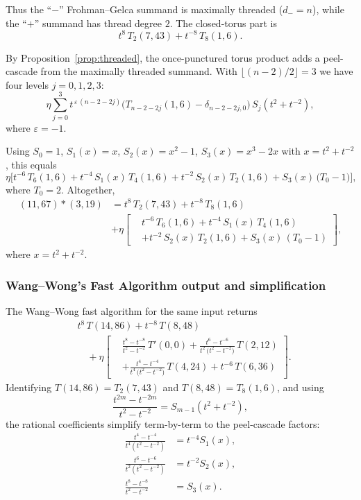 \documentclass[12pt]{article}
\begin{document}
Thus the ``$-$'' Frohman--Gelca summand is maximally threaded ($d_{-}=n$), while the ``$+$'' summand has thread degree $2$. The closed-torus part is
\[
t^{8}\,T_{2}(7,43) + t^{-8}\,T_{8}(1,6).
\]

By Proposition~\ref{prop:threaded}, the once-punctured torus product adds a peel-cascade from the maximally threaded summand. With $\lfloor(n-2)/2\rfloor=3$ we have four levels $j=0,1,2,3$:
\[
\eta\!\sum_{j=0}^{3} t^{\,\varepsilon\,(n-2-2j)}
\Big(T_{n-2-2j}(1,6)-\delta_{n-2-2j,0}\Big)\,S_j(t^{2}+t^{-2}),
\]
where $\varepsilon=-1$.

Using $S_{0}=1$, $S_{1}(x)=x$, $S_{2}(x)=x^{2}-1$, $S_{3}(x)=x^{3}-2x$ with $x=t^{2}+t^{-2}$, this equals
\[
\eta\Big[
t^{-6}\,T_{6}(1,6) + t^{-4}\,S_{1}(x)\,T_{4}(1,6)
+ t^{-2}\,S_{2}(x)\,T_{2}(1,6) + S_{3}(x)\,\big(T_{0}-1\big)
\Big],
\]
where $T_{0}=2$. Altogether,
\begin{align}
(11,67)\ast(3,19) &= t^{8}\,T_{2}(7,43) + t^{-8}\,T_{8}(1,6) \\
&+ \eta\left[\begin{aligned}
&t^{-6}\,T_{6}(1,6) + t^{-4}\,S_{1}(x)\,T_{4}(1,6) \\
&+ t^{-2}\,S_{2}(x)\,T_{2}(1,6) + S_{3}(x)\,(T_{0}-1)
\end{aligned}\right],
\end{align}
where $x=t^{2}+t^{-2}.$
\subsubsection*{Wang--Wong's Fast Algorithm output and simplification}

The Wang--Wong fast algorithm for the same input returns
\begin{align}
&t^{8}\,T(14,86) + t^{-8}\,T(8,48) \nonumber \\
&\quad + \eta\left[\begin{aligned}
&\frac{t^{8}-t^{-8}}{t^{2}-t^{-2}}\,T'(0,0) + \frac{t^{6}-t^{-6}}{t^{2}\,\big(t^{2}-t^{-2}\big)}\,T(2,12) \\
&+ \frac{t^{4}-t^{-4}}{t^{4}\,\big(t^{2}-t^{-2}\big)}\,T(4,24) + t^{-6}\,T(6,36)
\end{aligned}\right].
\end{align}
Identifying $T(14,86)=T_{2}(7,43)$ and $T(8,48)=T_{8}(1,6)$, and using
\[
\frac{t^{2m}-t^{-2m}}{t^{2}-t^{-2}}=S_{m-1}(t^{2}+t^{-2}),
\]
the rational coefficients simplify term-by-term to the peel-cascade factors:
\begin{align}
\frac{t^{4}-t^{-4}}{t^{4}(t^{2}-t^{-2})} &= t^{-4}S_{1}(x), \\
\frac{t^{6}-t^{-6}}{t^{2}(t^{2}-t^{-2})} &= t^{-2}S_{2}(x), \\
\frac{t^{8}-t^{-8}}{t^{2}-t^{-2}} &= S_{3}(x).
\end{align}
\end{document}
